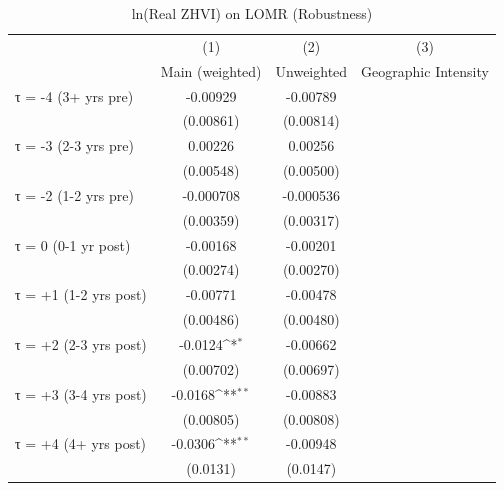 \begin{table}[htbp]\centering
\def\sym#1{\ifmmode^{#1}\else\(^{#1}\)\fi}
\caption{ln(Real ZHVI) on LOMR (Robustness)}
\begin{tabular}{l*{3}{c}}
\hline\hline
                    &\multicolumn{1}{c}{(1)}&\multicolumn{1}{c}{(2)}&\multicolumn{1}{c}{(3)}\\
                    &\multicolumn{1}{c}{Main (weighted)}&\multicolumn{1}{c}{Unweighted}&\multicolumn{1}{c}{Geographic Intensity}\\
\hline
τ = -4 (3+ yrs pre) &    -0.00929         &    -0.00789         &                     \\
                    &   (0.00861)         &   (0.00814)         &                     \\
[1em]
τ = -3 (2-3 yrs pre)&     0.00226         &     0.00256         &                     \\
                    &   (0.00548)         &   (0.00500)         &                     \\
[1em]
τ = -2 (1-2 yrs pre)&   -0.000708         &   -0.000536         &                     \\
                    &   (0.00359)         &   (0.00317)         &                     \\
[1em]
τ = 0 (0-1 yr post) &    -0.00168         &    -0.00201         &                     \\
                    &   (0.00274)         &   (0.00270)         &                     \\
[1em]
τ = +1 (1-2 yrs post)&    -0.00771         &    -0.00478         &                     \\
                    &   (0.00486)         &   (0.00480)         &                     \\
[1em]
τ = +2 (2-3 yrs post)&     -0.0124\sym{*}  &    -0.00662         &                     \\
                    &   (0.00702)         &   (0.00697)         &                     \\
[1em]
τ = +3 (3-4 yrs post)&     -0.0168\sym{**} &    -0.00883         &                     \\
                    &   (0.00805)         &   (0.00808)         &                     \\
[1em]
τ = +4 (4+ yrs post)&     -0.0306\sym{**} &    -0.00948         &                     \\
                    &    (0.0131)         &    (0.0147)         &                     \\

\end{tabular}
\end{table}
